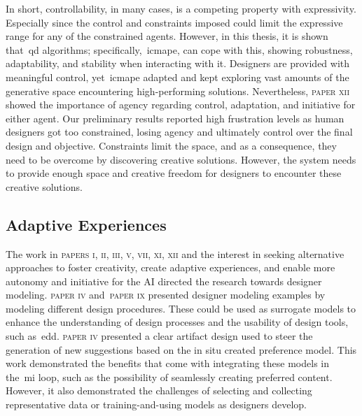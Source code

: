 

In short, controllability, in many cases, is a competing property with expressivity. Especially since the control and constraints imposed could limit the expressive range for any of the constrained agents. However, in this thesis, it is shown that~\acrshort{qd} algorithms; specifically,~\acrshort{icmape}, can cope with this, showing robustness, adaptability, and stability when interacting with it. Designers are provided with meaningful control, yet~\acrshort{icmape} adapted and kept exploring vast amounts of the generative space encountering high-performing solutions. Nevertheless, \textsc{paper xii} showed the importance of agency regarding control, adaptation, and initiative for either agent. Our preliminary results reported high frustration levels as human designers got too constrained, losing agency and ultimately control over the final design and objective. Constraints limit the space, and as a consequence, they need to be overcome by discovering creative solutions. However, the system needs to provide enough space and creative freedom for designers to encounter these creative solutions.





\subsection{Adaptive Experiences}

The work in \textsc{papers i, ii, iii, v, vii, xi, xii} and the interest in seeking alternative approaches to foster creativity, create adaptive experiences, and enable more autonomy and initiative for the AI directed the research towards designer modeling. \textsc{paper iv} and~\textsc{paper ix} presented designer modeling examples by modeling different design procedures. These could be used as surrogate models to enhance the understanding of design processes and the usability of design tools, such as~\acrshort{edd}. \textsc{paper iv} presented a clear artifact design used to steer the generation of new suggestions based on the in situ created preference model. This work demonstrated the benefits that come with integrating these models in the~\acrshort{mi} loop, such as the possibility of seamlessly creating preferred content. However, it also demonstrated the challenges of selecting and collecting representative data or training-and-using models as designers develop.

